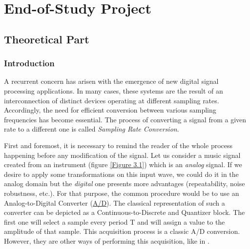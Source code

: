 
\chapter{End-of-Study Project} %

\label{Chapter3} %


\newcommand{\keyword}[1]{\textbf{#1}}
\newcommand{\tabhead}[1]{\textbf{#1}}
\newcommand{\code}[1]{\texttt{#1}}
\newcommand{\file}[1]{\texttt{\bfseries#1}}
\newcommand{\option}[1]{\texttt{\itshape#1}}


\section{Theoretical Part}


\subsection{Introduction}
A recurrent concern has arisen with the emergence of new digital signal processing applications. In many cases, these systems are the result of an interconnection of distinct devices operating at different sampling rates. Accordingly, the need for efficient conversion between various sampling frequencies has become essential. The process of converting a signal from a given rate to a different one is called \textit{Sampling Rate Conversion}.

First and foremost, it is necessary to remind the reader of the whole process happening before any modification of the signal. Let us consider a music signal created from an instrument (figure \ref{Figure 3.1}) which is an \textit{analog} signal. If we desire to apply some transformations on this input wave, we could do it in the analog domain but the \textit{digital} one presents more advantages (repeatability, noise robustness, etc.). For that purpose, the common procedure would be to use an Analog-to-Digital Converter (\hyperlink{A/D}{A/D}). The classical representation of such a converter can be depicted as a Continuous-to-Discrete and Quantizer block. The first one will select a sample every period T and  will assign a value to the amplitude of that sample. This acquisition process is a classic A/D conversion. However, they are other ways of performing this acquisition, like in \cite{AmpSamp}.


